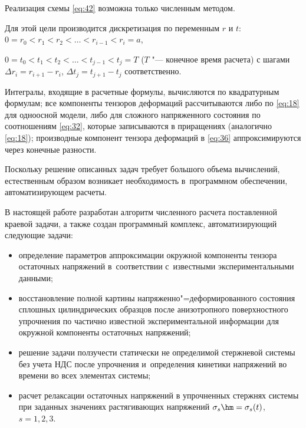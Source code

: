 
Реализация схемы \eqref{eq:42} возможна только численным методом.

Для этой цели производится дискретизация  по переменным $r$ и $t$: $0 = r_0 < r_1 < r_2 < \ldots < r_{i-1} < r_i = a$, 

$0 = t_0 < t_1 < t_2 < \ldots < t_{j-1} < t_j = T$ ($T$ "--- конечное время расчета) с шагами $\Delta r_i = r_{i+1} - r_i$, $\Delta t_j = t_{j+1} - t_j$ соответственно. 

Интегралы, входящие в расчетные формулы, вычисляются по квадратурным формулам; все компоненты тензоров деформаций рассчитываются либо по \eqref{eq:18} для одноосной модели, либо для сложного напряженного состояния по соотношениям \eqref{eq:32}, которые записываются в приращениях (аналогично \eqref{eq:18}); производные компонент тензора деформаций в \eqref{eq:36} аппроксимируются через конечные разности.



Поскольку решение описанных задач требует большого объема вычислений, естественным образом возникает необходимость в~программном обеспечении, автоматизирующем расчеты.



В настоящей работе разработан алгоритм численного расчета поставленной краевой задачи, а также создан программный комплекс, автоматизирующий следующие задачи:

\begin{itemize}

\item[1)] определение параметров аппроксимации окружной компоненты тензора остаточных напряжений в~соответствии с~известными экспериментальными данными;

\item[2)] восстановление полной картины напряженно"=деформированного состояния сплошных цилиндрических образцов после анизотропного по\-верх\-ност\-но\-го упрочнения по частично известной экспериментальной информации для окружной компоненты остаточных напряжений;

\item[3)] решение задачи ползучести статически не определимой стержневой системы без учета НДС после упрочнения и~определения кинетики напряжений во времени во всех элементах системы;

\item[4)] расчет релаксации остаточных напряжений в упрочненных стержнях системы при заданных значениях растягивающих напряжений $\sigma_s \hm= \sigma_s (t)$, $s=1,2,3$.

\end{itemize}



